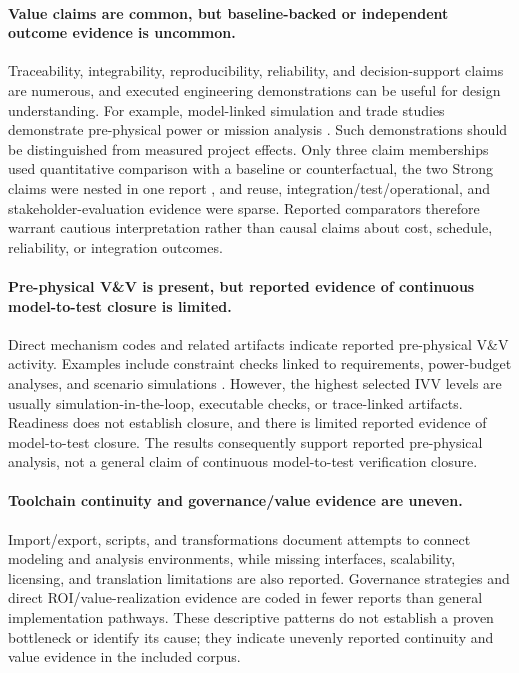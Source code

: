 \documentclass[alpha-refs]{wiley-article}
\begin{document}
\paragraph{Value claims are common, but baseline-backed or independent outcome evidence is uncommon.}
Traceability, integrability, reproducibility, reliability, and decision-support claims are numerous, and executed engineering demonstrations can be useful for design understanding.  For example, model-linked simulation and trade studies demonstrate pre-physical power or mission analysis \cite{paper-0001,paper-0003,paper-0029,paper-0043,paper-0053,paper-0059}.  Such demonstrations should be distinguished from measured project effects.  Only three claim memberships used quantitative comparison with a baseline or counterfactual, the two Strong claims were nested in one report \cite{paper-0061}, and reuse, integration/test/operational, and stakeholder-evaluation evidence were sparse.  Reported comparators therefore warrant cautious interpretation rather than causal claims about cost, schedule, reliability, or integration outcomes.

\paragraph{Pre-physical V\&V is present, but reported evidence of continuous model-to-test closure is limited.}
Direct mechanism codes and related artifacts indicate reported pre-physical V\&V activity.  Examples include constraint checks linked to requirements, power-budget analyses, and scenario simulations \cite{paper-0026,paper-0023,paper-0059,paper-0080}.  However, the highest selected IVV levels are usually simulation-in-the-loop, executable checks, or trace-linked artifacts.  Readiness does not establish closure, and there is limited reported evidence of model-to-test closure.  The results consequently support reported pre-physical analysis, not a general claim of continuous model-to-test verification closure.

\paragraph{Toolchain continuity and governance/value evidence are uneven.}
Import/export, scripts, and transformations document attempts to connect modeling and analysis environments, while missing interfaces, scalability, licensing, and translation limitations are also reported.  Governance strategies and direct ROI/value-realization evidence are coded in fewer reports than general implementation pathways.  These descriptive patterns do not establish a proven bottleneck or identify its cause; they indicate unevenly reported continuity and value evidence in the included corpus.
\end{document}
